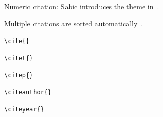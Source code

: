 Numeric citation: Sabic introduces the theme in~\cite{demo}.

\medskip

Multiple citations are sorted automatically~\cite{knuth1984,lamport1994,demo}.

\medskip

\begin{description}
    \item[\texttt{\textbackslash cite\{\}}]      \cite{knuth1984}
    \item[\texttt{\textbackslash citet\{\}}]     \citet{lamport1994}
    \item[\texttt{\textbackslash citep\{\}}]     \citep{tantau2023}
    \item[\texttt{\textbackslash citeauthor\{\}}] \citeauthor{knuth1984}
    \item[\texttt{\textbackslash citeyear\{\}}]  \citeyear{lamport1994}
\end{description}
